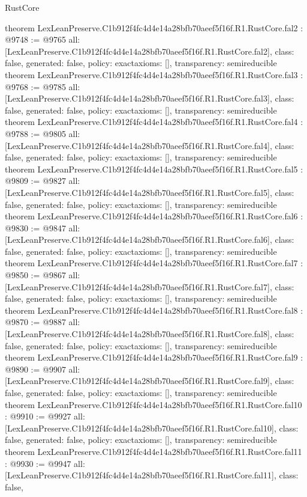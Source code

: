 \begin{lexlean}{RustCore}
\begin{coremodule}
theorem LexLeanPreserve.C1b912f4fc4d4e14a28bfb70aeef5f16f.R1.RustCore.fal2 : @9748 := @9765 {
  all: [LexLeanPreserve.C1b912f4fc4d4e14a28bfb70aeef5f16f.R1.RustCore.fal2],
  class: false,
  generated: false,
  policy: exact{axioms: []},
  transparency: semireducible
}
theorem LexLeanPreserve.C1b912f4fc4d4e14a28bfb70aeef5f16f.R1.RustCore.fal3 : @9768 := @9785 {
  all: [LexLeanPreserve.C1b912f4fc4d4e14a28bfb70aeef5f16f.R1.RustCore.fal3],
  class: false,
  generated: false,
  policy: exact{axioms: []},
  transparency: semireducible
}
theorem LexLeanPreserve.C1b912f4fc4d4e14a28bfb70aeef5f16f.R1.RustCore.fal4 : @9788 := @9805 {
  all: [LexLeanPreserve.C1b912f4fc4d4e14a28bfb70aeef5f16f.R1.RustCore.fal4],
  class: false,
  generated: false,
  policy: exact{axioms: []},
  transparency: semireducible
}
theorem LexLeanPreserve.C1b912f4fc4d4e14a28bfb70aeef5f16f.R1.RustCore.fal5 : @9809 := @9827 {
  all: [LexLeanPreserve.C1b912f4fc4d4e14a28bfb70aeef5f16f.R1.RustCore.fal5],
  class: false,
  generated: false,
  policy: exact{axioms: []},
  transparency: semireducible
}
theorem LexLeanPreserve.C1b912f4fc4d4e14a28bfb70aeef5f16f.R1.RustCore.fal6 : @9830 := @9847 {
  all: [LexLeanPreserve.C1b912f4fc4d4e14a28bfb70aeef5f16f.R1.RustCore.fal6],
  class: false,
  generated: false,
  policy: exact{axioms: []},
  transparency: semireducible
}
theorem LexLeanPreserve.C1b912f4fc4d4e14a28bfb70aeef5f16f.R1.RustCore.fal7 : @9850 := @9867 {
  all: [LexLeanPreserve.C1b912f4fc4d4e14a28bfb70aeef5f16f.R1.RustCore.fal7],
  class: false,
  generated: false,
  policy: exact{axioms: []},
  transparency: semireducible
}
theorem LexLeanPreserve.C1b912f4fc4d4e14a28bfb70aeef5f16f.R1.RustCore.fal8 : @9870 := @9887 {
  all: [LexLeanPreserve.C1b912f4fc4d4e14a28bfb70aeef5f16f.R1.RustCore.fal8],
  class: false,
  generated: false,
  policy: exact{axioms: []},
  transparency: semireducible
}
theorem LexLeanPreserve.C1b912f4fc4d4e14a28bfb70aeef5f16f.R1.RustCore.fal9 : @9890 := @9907 {
  all: [LexLeanPreserve.C1b912f4fc4d4e14a28bfb70aeef5f16f.R1.RustCore.fal9],
  class: false,
  generated: false,
  policy: exact{axioms: []},
  transparency: semireducible
}
theorem LexLeanPreserve.C1b912f4fc4d4e14a28bfb70aeef5f16f.R1.RustCore.fal10 : @9910 := @9927 {
  all: [LexLeanPreserve.C1b912f4fc4d4e14a28bfb70aeef5f16f.R1.RustCore.fal10],
  class: false,
  generated: false,
  policy: exact{axioms: []},
  transparency: semireducible
}
theorem LexLeanPreserve.C1b912f4fc4d4e14a28bfb70aeef5f16f.R1.RustCore.fal11 : @9930 := @9947 {
  all: [LexLeanPreserve.C1b912f4fc4d4e14a28bfb70aeef5f16f.R1.RustCore.fal11],
  class: false,
}
\end{coremodule}
\end{lexlean}
